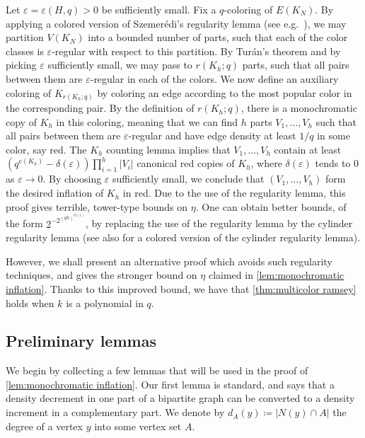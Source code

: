 \documentclass{aic}
\theoremstyle{plain}
\theoremstyle{remark}
\newcommand\ab[1]{\lvert #1 \rvert}
\begin{document}
Let $\varepsilon = \varepsilon(H,q)>0$ be sufficiently small. Fix a $q$-coloring of $E(K_N)$. By applying a colored version of Szemer\'edi's regularity lemma (see e.g.\ \cite[Theorem 1.18]{MR1395865}), we may partition $V(K_N)$ into a bounded number of parts, such that each of the color classes is $\varepsilon$-regular with respect to this partition. By Tur\'an's theorem and by picking $\varepsilon$ sufficiently small, we may pass to $r(K_h;q)$ parts, such that all pairs between them are $\varepsilon$-regular in each of the colors. We now define an auxiliary coloring of $K_{r(K_h;q)}$ by coloring an edge according to the most popular color in the corresponding pair. By the definition of $r(K_h;q)$, there is a monochromatic copy of $K_h$ in this coloring, meaning that we can find $h$ parts $V_1,\dots,V_h$ such that all pairs between them are $\varepsilon$-regular and have edge density at least $1/q$ in some color, say red. The $K_h$ counting lemma implies that $V_1,\dots,V_h$ contain at least $(q^{e(K_h)}-\delta(\varepsilon))\prod_{i=1}^h \ab{V_i}$ canonical red copies of $K_h$, where $\delta(\varepsilon)$ tends to $0$ as $\varepsilon \to 0$. By choosing $\varepsilon$ sufficiently small, we conclude that $(V_1,\dots,V_h)$ form the desired inflation of $K_h$ in red. Due to the use of the regularity lemma, this proof gives terrible, tower-type bounds on $\eta$. One can obtain better bounds, of the form $2^{-2^{(qh)^{O(1)}}}$, by replacing the use of the regularity lemma by the cylinder regularity lemma \cite{MR1333857} (see also \cite{MR4170446} for a colored version of the cylinder regularity lemma).


However, we shall present an alternative proof which avoids such regularity techniques, and gives the stronger bound on $\eta$ claimed in \cref{lem:monochromatic inflation}. Thanks to this improved bound, we have that \cref{thm:multicolor ramsey} holds when $k$ is a polynomial in $q$.


\subsection{Preliminary lemmas}
We begin by collecting a few lemmas that will be used in the proof of \cref{lem:monochromatic inflation}.
 Our first lemma is standard, and says that a density decrement in one part of a bipartite graph can be converted to a density increment in a complementary part.
 We denote by $d_{A}(y) \coloneqq \ab{N(y) \cap A}$ the degree of a vertex $y$ into some vertex set $A$.
\end{document}
